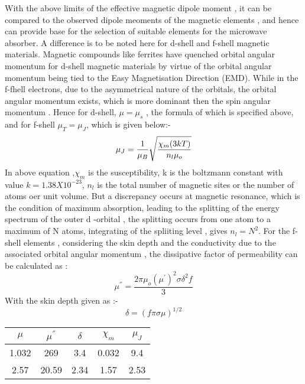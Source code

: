 \documentclass[journal]{IEEEtran}
\begin{document}
\begin{multicols}{2}
With the above limits of the effective magnetic dipole moment , it can be compared to the observed dipole meoments of the magnetic elements , and hence can provide base for the selection of suitable elements for the microwave absorber. A difference is to be noted here for d-shell and f-shell magnetic materials.  Magnetic compounds like ferrites have quenched orbital angular momentum for d-shell magnetic materials by virtue of the  orbital angular momentum being tied to the Easy Magnetisation Direction (EMD). While in the f-fhell electrons, due to the asymmetrical nature of the orbitals, the orbital angular momentum exists, which is more dominant then the spin angular momentum \cite{mchenry2002magnetic}. Hence for d-shell, $\mu = \mu_s$ , the formula of which is specified above, and for f-shell $\mu_T= \mu_J$, which is given below:-
\begin{equation}
\mu_J = \dfrac{1}{\mu_B} \sqrt{\frac{\chi_m ( 3kT)}{n_l \mu_o}} \\
\end{equation}
In above equation ,$\chi_m$ is the susceptibility, k is the boltzmann constant with value $k = 1.38 X 10^{-23}$, $n_l$ is the total number of magnetic sites or the number of atoms oer unit volume. But a discrepancy occurs at magnetic resonance, which is the condition of maximum absorption, leading to the splitting of the energy spectrum of the outer d -orbital , the splitting occurs from one atom to a maximum of N atoms, integrating of the spliiting level , gives $n_l = N^2$.
For the f-shell elements , considering the skin depth and the conductivity due to the associated orbital angular momentum , the dissipative factor of   permeability can be calculated as \cite{luo2017excellent}:
\begin{equation}
\mu^{''} = \dfrac{2 \pi \mu_o {(\mu^{'})}^2 \sigma \delta^{2} f}{3}
\end{equation}
With the skin depth given as :-
\begin{equation}
\delta = {(f \pi \sigma \mu)}^{1/2}
\end{equation}

	\begin{tabular*}{0.5pt}{|c|c|c|c|c|}
		\hline
		$\mu$ & $ \mu^{''}$ & $\delta$ & $ \chi_m$ & $\mu_J $\\
		\hline
		1.032 & 269 &  3.4 & 0.032 &9.4 \\ 
		\hline
		2.57  & 20.59 & 2.34 & 1.57 & 2.53 \\ 
		\hline
	\end{tabular*}
\newline
\newline





\end{multicols}
\end{document}
